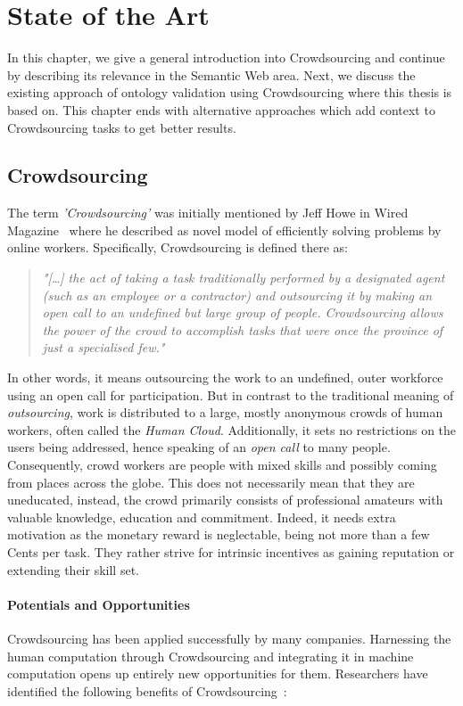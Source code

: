 \documentclass[draft,final]{vutinfth} %
\begin{document}
\chapter{State of the Art}\label{chap:state_of_the_art}
In this chapter, we give a general introduction into Crowdsourcing and continue by describing its relevance in the Semantic Web area. Next, we discuss the existing approach of ontology validation using Crowdsourcing where this thesis is based on. This chapter ends with alternative approaches which add context to Crowdsourcing tasks to get better results. 

\section{Crowdsourcing}
The term \emph{'Crowdsourcing'} was initially mentioned by Jeff Howe in Wired Magazine~\cite{howe2006} where he described as novel model of efficiently solving problems by online workers. Specifically, Crowdsourcing is defined there as:
\begin{quotation}
	\textit{"[\ldots] the act of taking a task traditionally performed by a designated agent (such as an employee or a contractor) and outsourcing it by making an open call to an undefined but large group of people.  Crowdsourcing allows the power of the crowd to accomplish tasks that were once the province of just a specialised few."}\cite{howe2008}
\end{quotation}
In other words, it means outsourcing the work to an undefined, outer workforce using an open call for participation. But in contrast to the traditional meaning of \emph{outsourcing}, work is distributed to a large, mostly anonymous crowds of human workers, often called the \emph{Human Cloud}. Additionally, it sets no restrictions on the users being addressed, hence speaking of an \emph{open call} to many people. Consequently, crowd workers are people with mixed skills and possibly coming from places across the globe. This does not necessarily mean that they are uneducated, instead, the crowd primarily consists of professional amateurs with valuable knowledge, education and commitment. Indeed, it needs extra motivation as the monetary reward is neglectable, being not more than a few Cents per task. They rather strive for intrinsic incentives as gaining reputation or extending their skill set. 

\subsubsection{Potentials and Opportunities}
Crowdsourcing has been applied successfully by many companies. Harnessing the human computation through Crowdsourcing and integrating it in machine computation opens up entirely new opportunities for them. Researchers have identified the following benefits of Crowdsourcing~\cite{schenk2012}:
\end{document}
